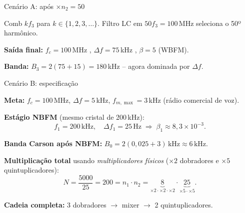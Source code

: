 \begin{frame}{Cenário A: após $\times n_2 = 50$}

Comb $k f_3$ para $k \in \{1, 2, 3, \ldots\}$. Filtro LC em $50 f_3 = 100$\,MHz seleciona o 50º harmônico.

\begin{center}
\end{center}

\textbf{Saída final:} $f_c = 100$\,MHz \checkmark,\;\; $\Delta f = 75$\,kHz \checkmark,\;\; $\beta = 5$ (WBFM).

\textbf{Banda:} $B_3 = 2(75 + 15) = 180$\,kHz -- agora dominada por $\Delta f$.

\end{frame}


\begin{frame}{Cenário B: especificação}

\textbf{Meta:} $f_c = 100$\,MHz, $\Delta f = 5$\,kHz, $f_{m,\max} = 3$\,kHz (rádio comercial de voz).

\pause
\textbf{Estágio NBFM} (mesmo cristal de 200\,kHz):
\[
f_1 = 200\,\text{kHz}, \quad \Delta f_1 = 25\,\text{Hz} \;\Rightarrow\; \beta_1 \approx 8{,}3\!\times\!10^{-3}.
\]

\pause
\textbf{Banda Carson após NBFM:} $B_0 = 2(0{,}025 + 3)\,\text{kHz} \approx 6\,\text{kHz}$.

\pause
\textbf{Multiplicação total} usando \emph{multiplicadores físicos} ($\times 2$ dobradores e $\times 5$ quintuplicadores):
\[
N = \frac{5000}{25} = 200 = n_1\cdot n_2 = \underbrace{8}_{\times 2\cdot\times 2\cdot\times 2}\cdot\underbrace{25}_{\times 5\cdot\times 5}.
\]

\textbf{Cadeia completa:} 3 dobradores $\to$ mixer $\to$ 2 quintuplicadores.

\end{frame}

